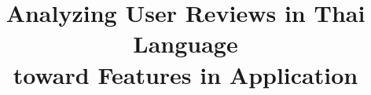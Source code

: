 \documentclass[conference]{IEEEtran}
\begin{document}
%
\title{Analyzing User Reviews in Thai Language\\ toward Features in Application}




% 




\end{document}
